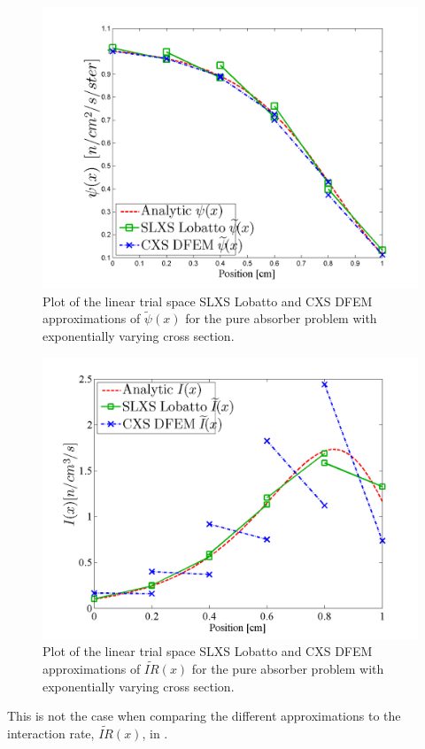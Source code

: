 \begin{figure}[!htp]
\centering
\includegraphics[width=12cm]{chapter3_variable_xs/SLXS_Psi_Profile.png}
\caption{Plot of the linear trial space SLXS Lobatto and CXS DFEM approximations of $\widetilde{\psi}(x)$ for the pure absorber problem with exponentially varying cross section.}
\label{fig:lobatto_blades_psi}
\end{figure}
%
%
\begin{figure}[!htp]
\centering
\includegraphics[width=12cm]{chapter3_variable_xs/SLXS_I_Profile.png}
\caption{Plot of the linear trial space SLXS Lobatto and CXS DFEM approximations of $\widetilde{IR}(x)$ for the pure absorber problem with exponentially varying cross section.}
\label{fig:lobatto_blades_ir}
\end{figure}
This is not the case when comparing the different approximations to the interaction rate, $\widetilde{IR}(x)$, in .  
